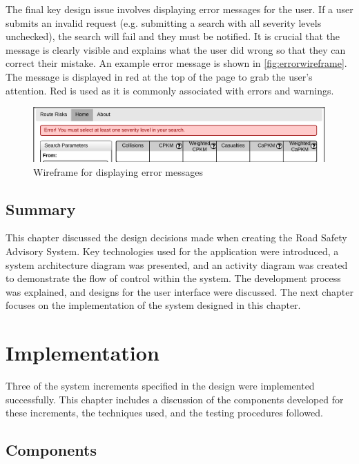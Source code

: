 \documentclass[authoryearcitations]{UoYCSproject}
\begin{document}
The final key design issue involves displaying error messages for the user. If a user submits an invalid request (e.g. submitting a search with all severity levels unchecked), the search will fail and they must be notified. It is crucial that the message is clearly visible and explains what the user did wrong so that they can correct their mistake. An example error message is shown in \autoref{fig:errorwireframe}. The message is displayed in red at the top of the page to grab the user's attention. Red is used as it is commonly associated with errors and warnings.

\begin{figure}
	\center
	\includegraphics[scale=0.7]{ErrorWireframe}
	\caption{Wireframe for displaying error messages}
	\label{fig:errorwireframe}
\end{figure}

\section{Summary}

This chapter discussed the design decisions made when creating the Road Safety Advisory System. Key technologies used for the application were introduced, a system architecture diagram was presented, and an activity diagram was created to demonstrate the flow of control within the system. The development process was explained, and designs for the user interface were discussed. The next chapter focuses on the implementation of the system designed in this chapter.

\chapter{Implementation}

Three of the system increments specified in the design were implemented successfully. This chapter includes a discussion of the components developed for these increments, the techniques used, and the testing procedures followed.

\section{Components}
\end{document}
